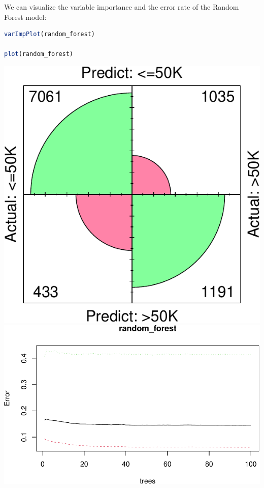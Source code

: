 \documentclass[
]{book}
\theoremstyle{definition}
\theoremstyle{definition}
\theoremstyle{definition}
\theoremstyle{definition}
\theoremstyle{remark}
\begin{document}
We can visualize the variable importance and the error rate of the Random Forest model:

\begin{lstlisting}[language=R]
varImpPlot(random_forest)

plot(random_forest)
\end{lstlisting}

\begin{center}\includegraphics{tree_files/figure-latex/unnamed-chunk-10-1} \includegraphics{tree_files/figure-latex/unnamed-chunk-10-2} \end{center}
\end{document}
